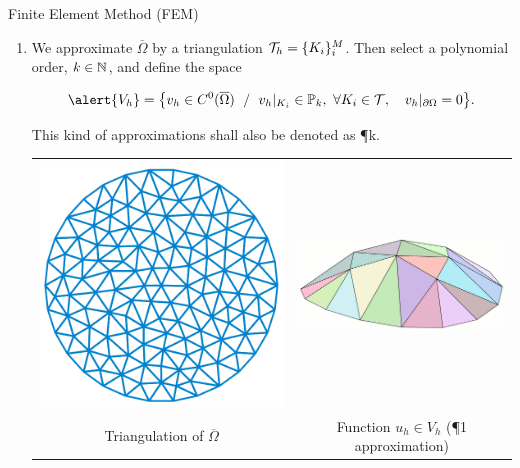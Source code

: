 \begin{frame}{Finite Element Method (FEM)}
  \begin{enumerate}
  \item We approximate $\overline\Omega$ by a \alert{triangulation
    ${\cal T}_h= \{K_i\}_{i}^M$}. Then select a polynomial order,
    \alert{$k\in{\mathbb N}$}, and define the space
    \begin{BlockNoTitle}
      \vspace{-0.5em}
      $$
      \alert{V_h} = \big\{ v_h\in C^0(\overline\Omega) \;\st\;
      v_h|_{K_i}\in\mathbb{P}_k, \ \forall K_i \in {\cal T}, \quad
      v_h|_{\partial\Omega}=0 \big\}.
      $$
    \end{BlockNoTitle}

    \medskip
    This kind of approximations shall also be denoted as \alert{\P{k}}.
    \medskip

    \setlength{\tabcolsep}{1.5em}
    \begin{center}
      \begin{tabular}{cc}
        \centering
        \includegraphics[height=0.25\linewidth]{img/FE_triangulation}
        &
          \includegraphics[height=0.18\linewidth]{img/FE_function_3d}
        \\
        {\scriptsize  Triangulation of $\overline\Omega$}
        &
          {\scriptsize Function $u_h \in V_h$ (\P1 approximation)}
      \end{tabular}
    \end{center}

  \end{enumerate}
\end{frame}

